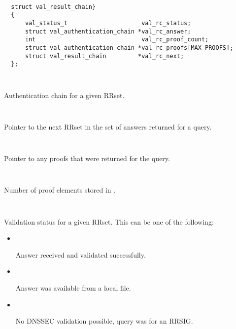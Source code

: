 \begin{description}

\item {}\verb" "

\begin{verbatim}
  struct val_result_chain}
  {
      val_status_t                     val_rc_status;
      struct val_authentication_chain *val_rc_answer;
      int                              val_rc_proof_count;
      struct val_authentication_chain *val_rc_proofs[MAX_PROOFS];
      struct val_result_chain         *val_rc_next;
  };
\end{verbatim}

\begin{description}

\item {}\verb" "

Authentication chain for a given RRset.

\item {}\verb" "

Pointer to the next RRset in the set of answers returned for a query.

\item {}\verb" "

Pointer to any proofs that were returned for the query.

\item {}\verb" "

Number of proof elements stored in .

\item {}\verb" "

Validation status for a given RRset.  This can be one of the following:

\begin{itemize}

\item {}\verb" "

Answer received and validated successfully.

\item {}\verb" "

Answer was available from a local file.

\item {}\verb" "

No DNSSEC validation possible, query was for an RRSIG.


\end{itemize}
\end{description}
\end{description}

